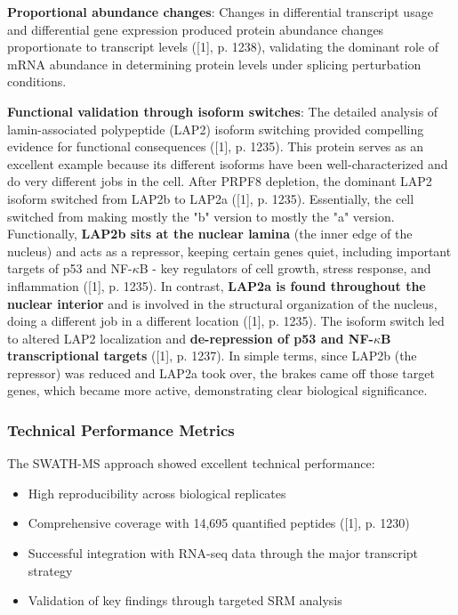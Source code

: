 \documentclass[12pt,a4paper]{article}
\begin{document}
\textbf{Proportional abundance changes}: Changes in differential transcript usage and differential gene expression produced protein abundance changes proportionate to transcript levels ([1], p. 1238), validating the dominant role of mRNA abundance in determining protein levels under splicing perturbation conditions.

\textbf{Functional validation through isoform switches}: The detailed analysis of lamin-associated polypeptide (LAP2) isoform switching provided compelling evidence for functional consequences ([1], p. 1235). This protein serves as an excellent example because its different isoforms have been well-characterized and do very different jobs in the cell. After PRPF8 depletion, the dominant LAP2 isoform switched from LAP2b to LAP2a ([1], p. 1235). Essentially, the cell switched from making mostly the "b" version to mostly the "a" version. Functionally, \textbf{LAP2b sits at the nuclear lamina} (the inner edge of the nucleus) and acts as a repressor, keeping certain genes quiet, including important targets of p53 and NF-$\kappa$B - key regulators of cell growth, stress response, and inflammation ([1], p. 1235). In contrast, \textbf{LAP2a is found throughout the nuclear interior} and is involved in the structural organization of the nucleus, doing a different job in a different location ([1], p. 1235). The isoform switch led to altered LAP2 localization and \textbf{de-repression of p53 and NF-$\kappa$B transcriptional targets} ([1], p. 1237). In simple terms, since LAP2b (the repressor) was reduced and LAP2a took over, the brakes came off those target genes, which became more active, demonstrating clear biological significance.

\subsubsection{Technical Performance Metrics}

The SWATH-MS approach showed excellent technical performance:
\begin{itemize}
    \item High reproducibility across biological replicates
    \item Comprehensive coverage with 14,695 quantified peptides ([1], p. 1230)
    \item Successful integration with RNA-seq data through the major transcript strategy
    \item Validation of key findings through targeted SRM analysis
\end{itemize}
\end{document}
